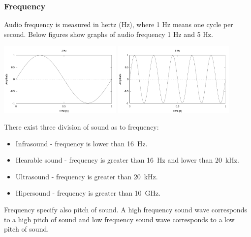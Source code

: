 \documentclass[11pt,titlepage]{article}
\theoremstyle{plain}
\begin{document}
\subsubsection{Frequency}
Audio frequency is measured in hertz (Hz), where 1 Hz means one cycle per second. Below figures show graphs of audio frequency 1 Hz and 5 Hz.

\begin{center}
	\includegraphics[width=0.45\textwidth]{img/frequency_1Hz}
	\includegraphics[width=0.45\textwidth]{img/frequency_5Hz}
\end{center}

There exist three division of sound as to frequency:
\begin{itemize}
	\item Infrasound - frequency is lower than 16~Hz.
	\item Hearable sound - frequency is greater than 16~Hz and lower than 20~kHz.
	\item Ultrasound - frequency is greater than 20~kHz.
	\item Hipersound - frequency is greater than 10~GHz.
\end{itemize}

Frequency specify also pitch of sound. A high frequency sound wave corresponds to a high pitch of sound and low frequency sound wave corresponds to a low pitch of sound.
\end{document}
